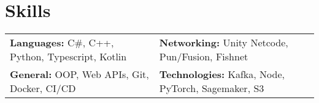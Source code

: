 
\vspace{5 pt - 0.5 cm}
\section{Skills}

\begin{center}
    \begin{tabularx}{\linewidth}{@{}X@{} @{}X@{}}
    \textbf{Languages:} C\#, C++, Python, Typescript, Kotlin & \textbf{Networking:} Unity Netcode, Pun/Fusion, Fishnet \\ 
    \textbf{General:} OOP, Web APIs, Git, Docker, CI/CD  & \textbf{Technologies:} Kafka, Node, PyTorch, Sagemaker, S3 \\     
    \end{tabularx}
\end{center}





